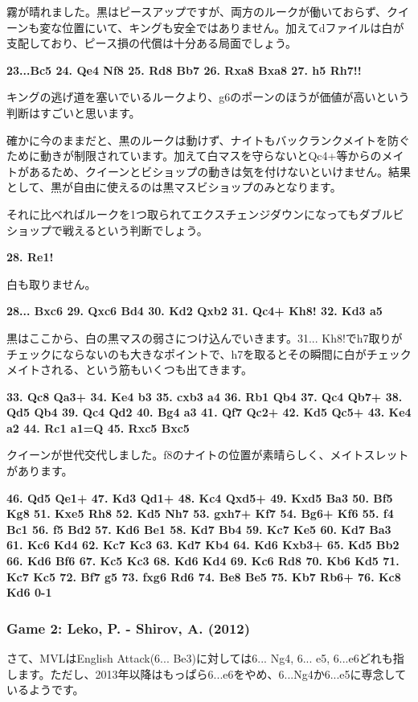 霧が晴れました。黒はピースアップですが、両方のルークが働いておらず、クイーンも変な位置にいて、キングも安全ではありません。加えてdファイルは白が支配しており、ピース損の代償は十分ある局面でしょう。

{\bf 23...Bc5 24. Qe4 Nf8 25. Rd8 Bb7 26. Rxa8 Bxa8 27. h5 Rh7!!}

キングの逃げ道を塞いでいるルークより、g6のポーンのほうが価値が高いという判断はすごいと思います。

確かに今のままだと、黒のルークは動けず、ナイトもバックランクメイトを防ぐために動きが制限されています。加えて白マスを守らないとQc4+等からのメイトがあるため、クイーンとビショップの動きは気を付けないといけません。結果として、黒が自由に使えるのは黒マスビショップのみとなります。

それに比べればルークを1つ取られてエクスチェンジダウンになってもダブルビショップで戦えるという判断でしょう。

{\bf 28. Re1!}

白も取りません。

{\bf 28... Bxc6 29. Qxc6 Bd4 30. Kd2 Qxb2 31. Qc4+ Kh8! 32. Kd3 a5}

黒はここから、白の黒マスの弱さにつけ込んでいきます。31... Kh8!でh7取りがチェックにならないのも大きなポイントで、h7を取るとその瞬間に白がチェックメイトされる、という筋もいくつも出てきます。

{\bf 33. Qc8 Qa3+ 34. Ke4 b3 35. cxb3 a4 36. Rb1 Qb4 37. Qc4 Qb7+ 38. Qd5 Qb4 39. Qc4 Qd2 40. Bg4 a3 41. Qf7 Qc2+ 42. Kd5 Qc5+ 43. Ke4 a2 44. Rc1 a1=Q 45. Rxc5 Bxc5}

クイーンが世代交代しました。f8のナイトの位置が素晴らしく、メイトスレットがあります。

{\bf 46. Qd5 Qe1+ 47. Kd3 Qd1+ 48. Kc4 Qxd5+ 49. Kxd5 Ba3 50. Bf5 Kg8 51. Kxe5 Rh8 52. Kd5 Nh7
53. gxh7+ Kf7 54. Bg6+ Kf6 55. f4 Bc1 56. f5 Bd2 57. Kd6 Be1 58. Kd7 Bb4 59. Kc7 Ke5 60. Kd7 Ba3 61. Kc6 Kd4 62. Kc7 Kc3 63. Kd7 Kb4 64. Kd6 Kxb3+ 65. Kd5 Bb2 66. Kd6 Bf6 67. Kc5 Kc3 68. Kd6 Kd4 69. Kc6 Rd8 70. Kb6 Kd5 71. Kc7 Kc5 72. Bf7 g5 73. fxg6 Rd6 74. Be8 Be5 75. Kb7 Rb6+ 76. Kc8 Kd6 0-1}

\subsubsection{Game 2: Leko, P. - Shirov, A. (2012)}

さて、MVLはEnglish Attack(6... Be3)に対しては6... Ng4, 6... e5, 6...e6どれも指します。ただし、2013年以降はもっぱら6...e6をやめ、6...Ng4か6...e5に専念しているようです。

